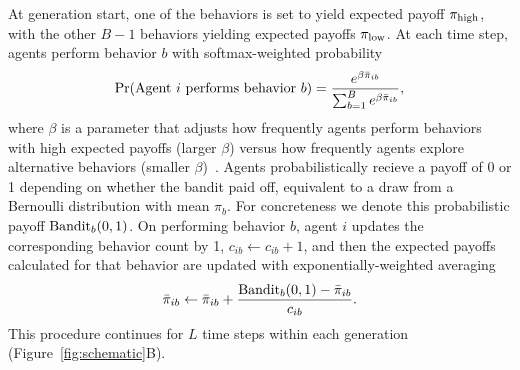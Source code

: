\documentclass[letterpaper,11.5pt]{scrartcl}
\begin{document}
At generation start, one of the behaviors is set to 
yield expected payoff $\pi_{\mathrm{high}}$, with the other $B-1$ behaviors yielding
expected payoffs $\pi_{\mathrm{low}}$. At each time step, agents perform behavior $b$ 
with softmax-weighted probability
\begin{equation}
  \Pr(\text{Agent $i$ performs behavior $b$}) = 
    \frac{e^{\beta \bar\pi_{ib}}}{\sum_{b=1}^B e^{\beta \bar\pi_{ib}}},
\end{equation}
\noindent
where $\beta$ is a parameter that adjusts how frequently agents perform 
behaviors with high expected payoffs (larger $\beta$) versus how frequently
agents explore alternative behaviors (smaller $\beta$)~\cite{McElreath2005}. 
Agents probabilistically recieve a payoff of 0 or 1 depending on whether the
bandit paid off, equivalent to a draw from a Bernoulli distribution with 
mean $\pi_b$. For concreteness we denote this probabilistic payoff
$\text{Bandit}_b(0, 1)$. On performing behavior $b$, agent $i$ updates the
corresponding behavior count by 1, $c_{ib} \leftarrow c_{ib} + 1$, and then
the expected payoffs calculated for that behavior are updated with
exponentially-weighted averaging
\begin{equation}
  \bar\pi_{ib} \leftarrow \bar\pi_{ib} + \frac{\text{Bandit}_b(0, 1) - \bar\pi_{ib}}{c_{ib}}.
\end{equation}
\noindent
This procedure continues for $L$ time steps within each generation
(Figure~\ref{fig:schematic}B).
\end{document}
